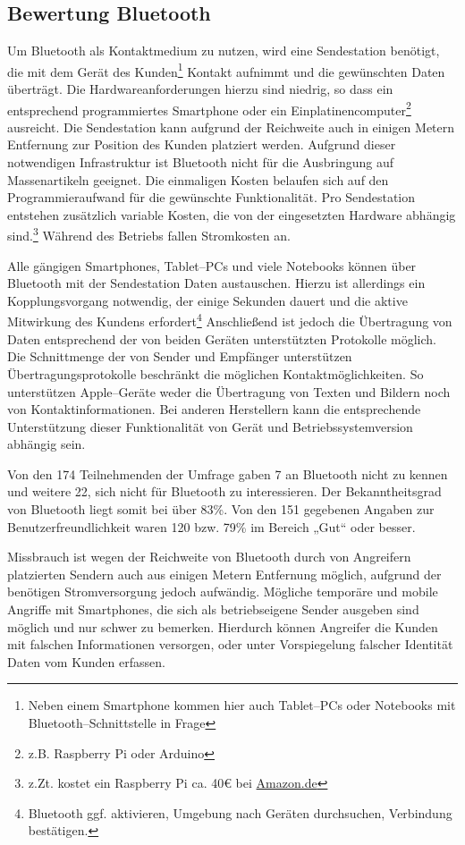 \subsection{Bewertung Bluetooth} %
\label{sub:bewertung_bluetooth}
Um Bluetooth als Kontaktmedium zu nutzen, wird eine Sendestation benötigt, die mit dem Gerät des Kunden\footnote{Neben einem Smartphone kommen hier auch Tablet–PCs oder Notebooks mit Bluetooth–Schnittstelle in Frage} Kontakt aufnimmt und die gewünschten Daten überträgt. Die Hardwareanforderungen hierzu sind niedrig, so dass ein entsprechend programmiertes Smartphone oder ein Einplatinencomputer\footnote{z.B. Raspberry Pi oder Arduino} ausreicht. Die Sendestation kann aufgrund der Reichweite auch in einigen Metern Entfernung zur Position des Kunden platziert werden. Aufgrund dieser notwendigen Infrastruktur ist Bluetooth nicht für die Ausbringung auf Massenartikeln geeignet. Die einmaligen Kosten belaufen sich auf den Programmieraufwand für die gewünschte Funktionalität. Pro Sendestation entstehen zusätzlich variable Kosten, die von der eingesetzten Hardware abhängig sind.\footnote{z.Zt. kostet ein Raspberry Pi ca. 40€ bei \url{Amazon.de}} Während des Betriebs fallen Stromkosten an.

Alle gängigen Smartphones, Tablet–PCs und viele Notebooks können über Bluetooth mit der Sendestation Daten austauschen. Hierzu ist allerdings ein Kopplungsvorgang notwendig, der einige Sekunden dauert und die aktive Mitwirkung des Kundens erfordert\footnote{Bluetooth ggf. aktivieren, Umgebung nach Geräten durchsuchen, Verbindung bestätigen.} Anschließend ist jedoch die Übertragung von Daten entsprechend der von beiden Geräten unterstützten Protokolle möglich. Die Schnittmenge der von Sender und Empfänger unterstützen Übertragungsprotokolle beschränkt die möglichen Kontaktmöglichkeiten. So unterstützen Apple–Geräte weder die Übertragung von Texten und Bildern noch von Kontaktinformationen. Bei anderen Herstellern kann die entsprechende Unterstützung dieser Funktionalität von Gerät und Betriebssystemversion abhängig sein.

Von den 174 Teilnehmenden der Umfrage gaben 7 an Bluetooth nicht zu kennen und weitere 22, sich nicht für Bluetooth zu interessieren. Der Bekanntheitsgrad von Bluetooth liegt somit bei über 83\%. Von den 151 gegebenen Angaben zur Benutzerfreundlichkeit waren 120 bzw. 79\% im Bereich „Gut“ oder besser.

Missbrauch ist wegen der Reichweite von Bluetooth durch von Angreifern platzierten Sendern auch aus einigen Metern Entfernung möglich, aufgrund der benötigen Stromversorgung jedoch aufwändig. Mögliche temporäre und mobile Angriffe mit Smartphones, die sich als betriebseigene Sender ausgeben sind möglich und nur schwer zu bemerken. Hierdurch können Angreifer die Kunden mit falschen Informationen versorgen, oder unter Vorspiegelung falscher Identität Daten vom Kunden erfassen.

